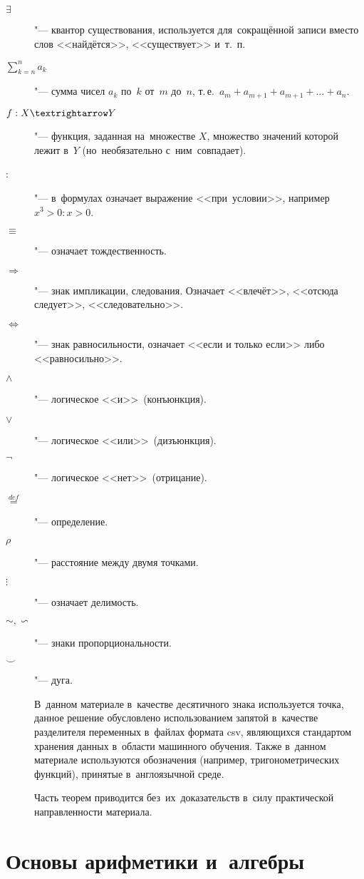 \documentclass[]{scrartcl}
\begin{document}
\begin{description}
	\item[$\exists$] "--- квантор существования, используется для~сокращённой записи вместо слов <<найдётся>>, <<существует>> и~т.~п.
	\item[$\sum \limits_{k=n}^{n} a_k$] "--- сумма чисел $a_k$ по~$k$ от~$m$ до~$n$, т.\,е.~$a_m + a_{m+1}+a_{m+1}+\ldots+a_n$.
	\item[$f:X \textrightarrow Y$] "--- функция, заданная на~множестве $X$, множество значений которой лежит в~$Y$ (но~необязательно с~ним~совпадает).	
	\item[:] "--- в~формулах означает выражение <<при~условии>>, например $x^3>0:x>0$.
	\item[$\equiv$] "--- означает тождественность.
	\item[$\Rightarrow$] "--- знак импликации, следования. Означает <<влечёт>>, <<отсюда следует>>, <<следовательно>>.
	\item[$\Leftrightarrow$] "--- знак равносильности, означает <<если и только если>> либо <<равносильно>>.
	\item[$\wedge$] "--- логическое <<и>>~(конъюнкция).
	\item[$\vee$] "--- логическое <<или>>~(дизъюнкция).
	\item[$\neg$] "--- логическое <<нет>>~(отрицание).
	\item[$\stackrel{def}{=}$] "--- определение.
	\item[$\rho$] "--- расстояние между двумя точками.
	\item[$\vdots$] "--- означает делимость.
	\item[$\sim, \backsim$] "--- знаки пропорциональности.
	\item[$\smile$] "--- дуга.

В~данном материале в~качестве десятичного знака используется точка, данное решение обусловлено использованием запятой в~качестве разделителя переменных в~файлах формата csv, являющихся стандартом хранения данных в~области машинного обучения. Также в~данном материале используются обозначения (например, тригонометрических функций), принятые в~англоязычной среде.

Часть теорем приводится без~их~доказательств в~силу практической направленности материала.	
	
\end{description}

\section{Основы арифметики и~алгебры}
\end{document}

